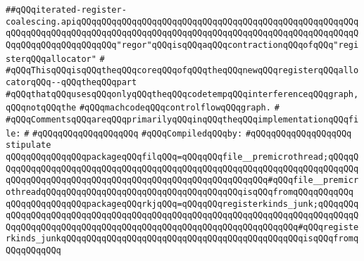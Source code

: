 \label{src/lib/compiler/back/low/regor/iterated-register-coalescing.api}
\verb|##qQQqiterated-register-coalescing.apiqQQqqQQqqQQqqQQqqQQqqQQqqQQqqQQqqQQqqQQqqQQqqQQqqQQqqQQqqQQqqQQqqQQqqQQqqQQqqQQqqQQqqQQqqQQqqQQqqQQqqQQqqQQqqQQqqQQqqQQqqQQqqQQqqQQqqQQqqQQqqQQqqQQq"regor"qQQqisqQQqaqQQqcontractionqQQqofqQQq"registerqQQqallocator"|\newline
\verb|#|\newline
\verb|#qQQqThisqQQqisqQQqtheqQQqcoreqQQqofqQQqtheqQQqnewqQQqregisterqQQqallocatorqQQq--qQQqtheqQQqpart|\newline
\verb|#qQQqthatqQQqusesqQQqonlyqQQqtheqQQqcodetempqQQqinterferenceqQQqgraph,qQQqnotqQQqthe|\newline
\verb|#qQQqmachcodeqQQqcontrolflowqQQqgraph.|\newline
\verb|#|\newline
\verb|#qQQqCommentsqQQqareqQQqprimarilyqQQqinqQQqtheqQQqimplementationqQQqfile:|\newline
\verb|#|\newline
\verb|#qQQqqQQqqQQqqQQqqQQq|\newline
\newline
\verb|#qQQqCompiledqQQqby:|\newline
\verb|#qQQqqQQqqQQqqQQqqQQq|\newline
\newline
\newline
\newline
\newline
\newline
\newline
\verb|stipulate|\newline
\verb|qQQqqQQqqQQqqQQqpackageqQQqfilqQQq=qQQqqQQqfile__premicrothread;qQQqqQQqqQQqqQQqqQQqqQQqqQQqqQQqqQQqqQQqqQQqqQQqqQQqqQQqqQQqqQQqqQQqqQQqqQQqqQQqqQQqqQQqqQQqqQQqqQQqqQQqqQQqqQQqqQQqqQQqqQQqqQQq#qQQqfile__premicrothreadqQQqqQQqqQQqqQQqqQQqqQQqqQQqqQQqqQQqqQQqisqQQqfromqQQqqQQqqQQq|\newline
\verb|qQQqqQQqqQQqqQQqpackageqQQqrkjqQQq=qQQqqQQqregisterkinds_junk;qQQqqQQqqQQqqQQqqQQqqQQqqQQqqQQqqQQqqQQqqQQqqQQqqQQqqQQqqQQqqQQqqQQqqQQqqQQqqQQqqQQqqQQqqQQqqQQqqQQqqQQqqQQqqQQqqQQqqQQqqQQqqQQqqQQqqQQq#qQQqregisterkinds_junkqQQqqQQqqQQqqQQqqQQqqQQqqQQqqQQqqQQqqQQqqQQqqQQqisqQQqfromqQQqqQQqqQQq|\newline

